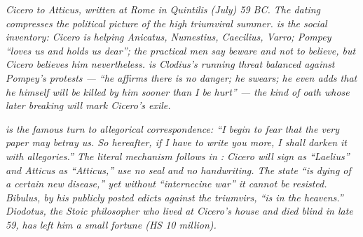 
\textit{Cicero to Atticus, written at Rome in Quintilis
(July) 59 BC. The dating compresses the political picture
of the high triumviral summer.  is the social
inventory: Cicero is helping Anicatus, Numestius, Caecilius,
Varro; Pompey ``loves us and holds us dear''; the practical
men say beware and not to believe, but Cicero believes him
nevertheless.  is Clodius's running threat
balanced against Pompey's protests --- ``he affirms there
is no danger; he swears; he even adds that he himself will
be killed by him sooner than I be hurt'' --- the kind of
oath whose later breaking will mark Cicero's exile.}

\textit{ is the famous turn to allegorical
correspondence: ``I begin to fear that the very paper may
betray us. So hereafter, if I have to write you more, I
shall darken it with allegories.'' The literal mechanism
follows in : Cicero will sign as ``Laelius''
and Atticus as ``Atticus,'' use no seal and no
handwriting. The state ``is dying of a certain new
disease,'' yet without ``internecine war'' it cannot be
resisted. Bibulus, by his publicly posted edicts against
the triumvirs, ``is in the heavens.'' Diodotus, the Stoic
philosopher who lived at Cicero's house and died blind in
late 59, has left him a small fortune (HS 10 million).}
